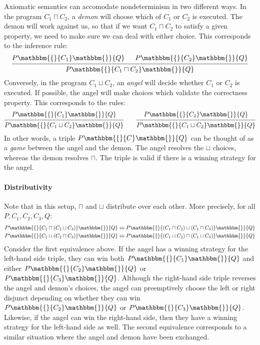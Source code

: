 \documentclass[format=sigplan,authordraft]{acmart}
\newcommand{\htr}[3]{{ {#1} \mathbbm{\{} {#2} \mathbbm{\}} {#3} }}
\begin{document}
Axiomatic semantics
can accomodate nondeterminism in two different ways.
In the program $C_1 \sqcap C_2$,
a \emph{demon} will choose which of $C_1$ or $C_2$ is executed.
The demon will work against us,
so that if we want $C_1 \sqcap C_2$ to satisfy a given property,
we need to make sure we can deal with either choice.
This corresponds to the inference rule:
\[
  \begin{prooftree}
    \hypo{\htr{P}{C_1}{Q}}
    \hypo{\htr{P}{C_2}{Q}}
    \infer2{\htr{P}{C_1 \sqcap C_2}{Q}}
  \end{prooftree}
\]
Conversely,
in the program $C_1 \sqcup C_2$,
an \emph{angel} will decide whether $C_1$ or $C_2$ is executed.
If possible,
the angel will make choices which validate
the correctness property.
This corresponds to the rules:
\[
  \begin{prooftree}
    \hypo{\htr{P}{C_1}{Q}}
    \infer1{\htr{P}{C_1 \sqcup C_2}{Q}}
  \end{prooftree}
  \qquad
  \begin{prooftree}
    \hypo{\htr{P}{C_2}{Q}}
    \infer1{\htr{P}{C_1 \sqcup C_2}{Q}}
  \end{prooftree}
\]
In other words,
a triple $\htr{P}{C}{Q}$
can be thought of as a \emph{game}
between the angel and the demon.
The angel resolves the $\sqcup$ choices,
whereas the demon resolves $\sqcap$.
The triple is valid if there is a winning strategy
for the angel.


\paragraph{Distributivity} %

Note that in this setup,
$\sqcap$ and $\sqcup$ distribute over each other.
More precisely, for all $P, C_1, C_2, C_3, Q$:
\begin{align*}
  \htr{P}{C_1 \sqcap (C_2 \sqcup C_3)}{Q} &\Leftrightarrow
    \htr{P}{(C_1 \sqcap C_2) \sqcup (C_1 \sqcap C_3)}{Q} \\
  \htr{P}{C_1 \sqcup (C_2 \sqcap C_3)}{Q} &\Leftrightarrow
    \htr{P}{(C_1 \sqcup C_2) \sqcap (C_1 \sqcup C_3)}{Q}
\end{align*}
Consider the first equivalence above.
If the angel has a winning strategy for
the left-hand side triple,
they can win both $\htr{P}{C_1}{Q}$
and either $\htr{P}{C_2}{Q}$ or $\htr{P}{C_3}{Q}$.
Although the right-hand side triple
reverses the angel and demon's choices,
the angel can preemptively choose the left or right
disjunct depending on whether they can win
$\htr{P}{C_2}{Q}$ or $\htr{P}{C_3}{Q}$.
Likewise, if the angel can win the right-hand side,
then they have a winning strategy for the left-hand side as well.
The second equivalence corresponds to a similar situation
where the angel and demon have been exchanged.
\end{document}

